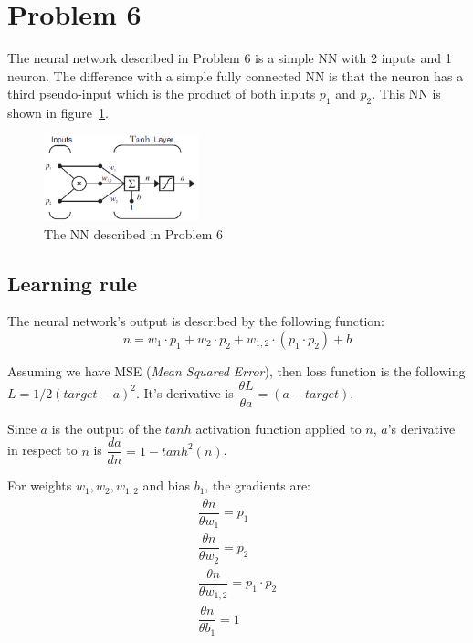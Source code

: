 \section{Problem 6}

The neural network described in Problem 6 is a simple NN with 2 inputs and 1 neuron. 
The difference with a simple fully connected NN is that the neuron has a third pseudo-input which is the product of both inputs $p_1$ and $p_2$.
This NN is shown in figure~\ref{fig:prob6_nn}.

\begin{figure}[htpb]
	\centering
	\includegraphics[width=0.4\textwidth]{../Problem 6/prob6_nn.png}
	\caption{The NN described in Problem 6}
	\label{fig:prob6_nn}
\end{figure}

\subsection{Learning rule}

The neural network's output is described by the following function:
\[
n = w_1 \cdot p_1 + w_2 \cdot p_2 + w_{1,2} \cdot \left(p_1 \cdot p_2\right) + b
\]

Assuming we have MSE (\textit{Mean Squared Error}), then loss function is the following $L = 1/2 \left( target - a\right)^2$.
It's derivative is $\dfrac{\theta L}{\theta a} = (a-target)$.

Since $a$ is the output of the $tanh$ activation function applied to $n$, $a$'s derivative in respect to $n$ is
$\dfrac{da}{dn} = 1 - tanh^2 \left(n\right)$.

For weights $w_1, w_2, w_{1,2}$ and bias $b_1$, the gradients are:
\[
\begin{array}{l}
	\dfrac{\theta n}{\theta w_1} = p_1 \\[3mm]
	\dfrac{\theta n}{\theta w_2} = p_2 \\[3mm]
	\dfrac{\theta n}{\theta w_{1,2}} = p_1 \cdot p_2 \\ [3mm]
	\dfrac{\theta n}{\theta b_1} = 1
\end{array}
\]

